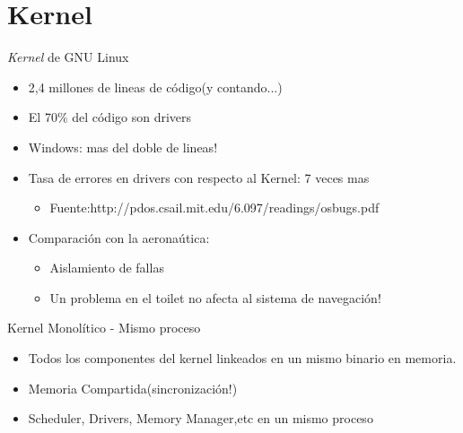 \section{Kernel}

\begin{frame}{ \textit{Kernel} de GNU Linux}
 \begin{itemize}
  \item 2,4 millones de lineas de código(y contando...)
  \item El 70\% del código son drivers
  \item Windows: mas del doble de lineas!
  \item Tasa de errores en drivers con respecto al Kernel: 7 veces mas
  	\begin{itemize}
 	  \item Fuente:http://pdos.csail.mit.edu/6.097/readings/osbugs.pdf 
  	\end{itemize}
    \item Comparación con la aeronaútica: 
 	\begin{itemize}
   	\item Aislamiento de fallas
	\item Un problema en el toilet no afecta al sistema de navegación!  
  	\end{itemize}
 \end{itemize}	

\end{frame}


\begin{frame}{Kernel Monolítico - Mismo proceso}
  \begin{center}
   \end{center}
 \begin{itemize}
    \item Todos los componentes del kernel linkeados en un mismo binario en memoria.
    \item Memoria Compartida(sincronización!) 
    \item Scheduler, Drivers, Memory Manager,etc en un mismo proceso 
   \end{itemize} 
\end{frame}

